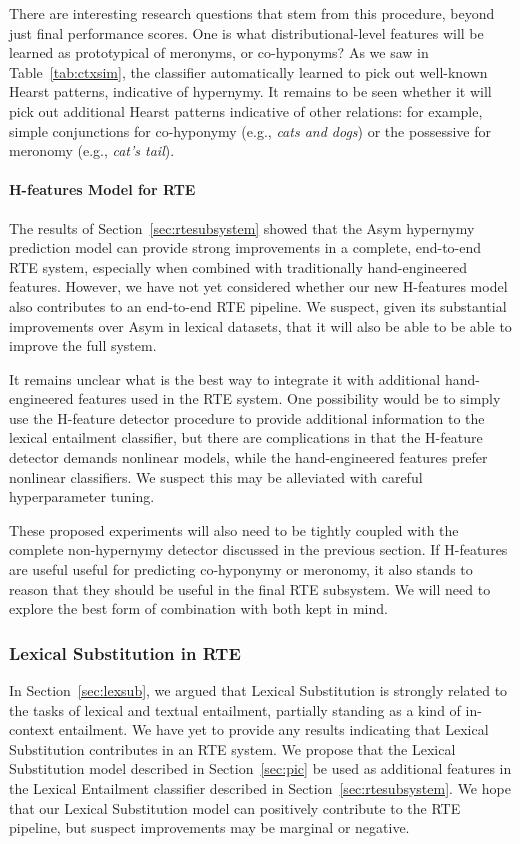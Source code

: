 \documentclass[12pt]{article}
\begin{document}
There are interesting research questions that stem from this procedure, beyond
just final performance scores. One is what distributional-level features will
be learned as prototypical of meronyms, or co-hyponyms? As we saw in
Table~\ref{tab:ctxsim}, the classifier automatically learned to pick
out well-known Hearst patterns, indicative of hypernymy. It remains to be seen
whether it will pick out additional Hearst patterns indicative of other
relations: for example, simple conjunctions for co-hyponymy (e.g., {\em cats
and dogs}) or the possessive for meronomy (e.g., {\em cat's tail}).

\paragraph{H-features Model for RTE}

The results of Section~\ref{sec:rtesubsystem} showed that the Asym hypernymy
prediction model can provide strong improvements in a complete, end-to-end RTE
system, especially when combined with traditionally hand-engineered features.
However, we have not yet considered whether our new H-features model also
contributes to an end-to-end RTE pipeline.
We suspect, given its substantial improvements over Asym in lexical datasets,
that it will also be able to be able to improve the full system.

It remains unclear what is the best way to integrate it with
additional hand-engineered features used in the RTE system. One possibility
would be to simply use the H-feature detector procedure to provide additional
information to the lexical entailment classifier, but there are complications
in that the H-feature detector demands nonlinear models, while the
hand-engineered features prefer nonlinear classifiers. We suspect this
may be alleviated with careful hyperparameter tuning.

These proposed experiments will also need to be tightly coupled with the
complete non-hypernymy detector discussed in the previous section. If H-features
are useful useful for predicting co-hyponymy or meronomy, it also stands to
reason that they should be useful in the final RTE subsystem. We will need to
explore the best form of combination with both kept in mind.

\subsubsection{Lexical Substitution in RTE}

In Section~\ref{sec:lexsub}, we argued that Lexical Substitution is strongly
related to the tasks of lexical and textual entailment, partially standing
as a kind of in-context entailment. We have yet to provide any results
indicating that Lexical Substitution contributes in an
RTE system.  We propose that the Lexical Substitution model described in
Section~\ref{sec:pic} be used as additional features in the Lexical
Entailment classifier described in Section~\ref{sec:rtesubsystem}. We hope that
our Lexical Substitution model can positively contribute to the RTE pipeline,
but suspect improvements may be marginal or negative.
\end{document}
